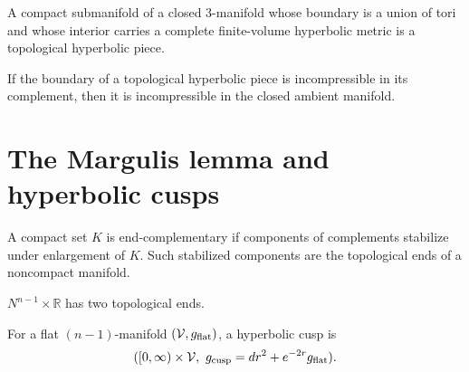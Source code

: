 \begin{definition}
\label{def:chow-iv-topological-hyperbolic-piece}
A compact submanifold of a closed 3-manifold whose boundary is a union of tori
and whose interior carries a complete finite-volume hyperbolic metric is a
topological hyperbolic piece.
\end{definition}

\begin{corollary}
\label{cor:chow-iv-hyperbolic-piece-incompressibility}
If the boundary of a topological hyperbolic piece is incompressible in its
complement, then it is incompressible in the closed ambient manifold.
\end{corollary}

\section{The Margulis lemma and hyperbolic cusps}

\begin{definition}
\label{def:chow-iv-topological-end}
A compact set \(K\) is end-complementary if components of complements stabilize
under enlargement of \(K\).  Such stabilized components are the topological
ends of a noncompact manifold.
\end{definition}

\begin{example}[Cylinder]
\label{ex:chow-iv-cylinder-ends}
\(N^{n-1}\times\mathbb R\) has two topological ends.
\end{example}

\begin{definition}
\label{def:chow-iv-hyperbolic-cusp}
For a flat \((n-1)\)-manifold \((\mathcal V,g_{\rm flat})\), a hyperbolic cusp is
\[
([0,\infty)\times\mathcal V,\ g_{\rm cusp}=dr^2+e^{-2r}g_{\rm flat}).
\]
\end{definition}

